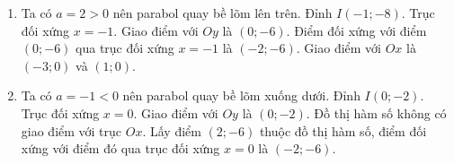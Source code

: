 \begin{bt}
{\begin{minipage}[c]{0.45\textwidth}
		\end{minipage}
		\begin{enumerate}
			\item Ta có $a=2>0$ nên parabol quay bề lõm lên trên. Đỉnh $I(-1;-8)$. Trục đối xứng $x=-1$. Giao điểm với $O y$ là $(0;-6)$. Điểm đối xứng với điểm $(0;-6)$ qua trục đối xứng $x=-1$ là $(-2;-6)$. Giao điểm với $O x$ là $(-3; 0)$ và $(1; 0).$
			\item Ta có $a=-1<0$ nên parabol quay bề lõm xuống dưới. Đỉnh $I(0;-2)$. Trục đối xứng $x=0$. Giao điểm với $O y$ là $(0;-2)$. Đồ thị hàm số không có giao điểm với trục $O x$. Lấy điểm $(2;-6)$ thuộc đồ thị hàm số, điểm đối xứng với điểm đó qua trục đối xứng $x=0$ là $(-2;-6).$
		\end{enumerate}
	}
\end{bt}

